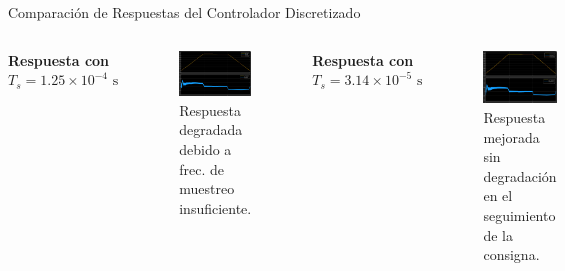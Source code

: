 \documentclass[12pt]{beamer}
\begin{document}
\begin{frame}{Comparación de Respuestas del Controlador Discretizado}
    \begin{columns}
        \textbf{Respuesta con \(T_s = 1.25 \times 10^{-4} \text{ s}\)}
        \begin{figure}
            \centering
            \includegraphics[width=\textwidth]{Imagenes/RespuestaControladorDiscretizadoT125E-4.png}
            \caption{Respuesta degradada debido a frec. de muestreo insuficiente.}
            \label{fig:RespuestaControladorDiscretizadoT125E-4}
        \end{figure}

        \textbf{Respuesta con \(T_s = 3.14 \times 10^{-5} \text{ s}\)}
        \begin{figure}
            \centering
            \includegraphics[width=\textwidth]{Imagenes/RespuestaControladorDiscretizadoT314E-5.png}
            \caption{Respuesta mejorada sin degradación en el seguimiento de la consigna.}
            \label{fig:RespuestaControladorDiscretizadoT314E-5}
        \end{figure}
    \end{columns}
\end{frame}
\end{document}
